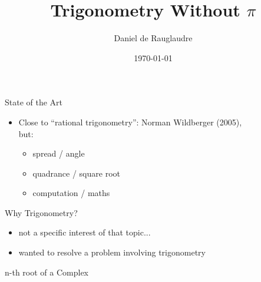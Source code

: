 \documentclass{beamer}
\title{Trigonometry Without $\pi$}
\author{Daniel de Rauglaudre}
\date{\today}
\begin{document}
\begin{frame}
    \titlepage
\end{frame}

\begin{frame}{}
\end{frame}

\begin{frame}{State of the Art}
  \begin{itemize}
    \item Close to ``rational trigonometry'': Norman Wildberger
      (2005),\\ but:
      \begin{itemize}
      \item spread / angle
      \item quadrance / square root
      \item computation / maths
      \end{itemize}
  \end{itemize}
\end{frame}

\begin{frame}{Why Trigonometry?}
  \begin{itemize}
  \item not a specific interest of that topic...
  \item wanted to resolve a problem involving trigonometry
  \end{itemize}
\end{frame}

\begin{frame}{n-th root of a Complex}
\end{frame}
\end{document}
